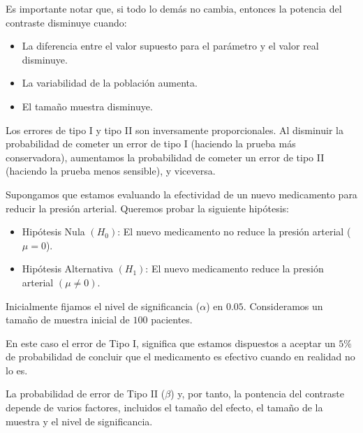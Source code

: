 \documentclass[
  letterpaper,
  DIV=11,
  numbers=noendperiod]{scrreprt}
\providecommand{\tightlist}{%
  \setlength{\itemsep}{0pt}\setlength{\parskip}{0pt}}\usepackage{longtable,booktabs,array}
\begin{document}
Es importante notar que, si todo lo demás no cambia, entonces la
potencia del contraste disminuye cuando:

\begin{itemize}
\tightlist
\item
  La diferencia entre el valor supuesto para el parámetro y el valor
  real disminuye.
\item
  La variabilidad de la población aumenta.
\item
  El tamaño muestra disminuye.
\end{itemize}

\begin{tcolorbox}[enhanced jigsaw, arc=.35mm, breakable, coltitle=black, left=2mm, opacityback=0, bottomtitle=1mm, colbacktitle=quarto-callout-tip-color!10!white, title=\textcolor{quarto-callout-tip-color}{\faLightbulb}\hspace{0.5em}{Ejemplo Práctico. Errores Tipo I y II}, titlerule=0mm, colback=white, colframe=quarto-callout-tip-color-frame, bottomrule=.15mm, rightrule=.15mm, opacitybacktitle=0.6, toptitle=1mm, toprule=.15mm, leftrule=.75mm]

Los errores de tipo I y tipo II son inversamente proporcionales. Al
disminuir la probabilidad de cometer un error de tipo I (haciendo la
prueba más conservadora), aumentamos la probabilidad de cometer un error
de tipo II (haciendo la prueba menos sensible), y viceversa.

Supongamos que estamos evaluando la efectividad de un nuevo medicamento
para reducir la presión arterial. Queremos probar la siguiente
hipótesis:

\begin{itemize}
\tightlist
\item
  Hipótesis Nula \((H_0)\): El nuevo medicamento no reduce la presión
  arterial (\(\mu = 0\)).
\item
  Hipótesis Alternativa \((H_1)\): El nuevo medicamento reduce la
  presión arterial \((\mu \neq 0)\).
\end{itemize}

Inicialmente fijamos el nivel de significancia (\(\alpha\)) en \(0.05\).
Consideramos un tamaño de muestra inicial de \(100\) pacientes.

En este caso el error de Tipo I, significa que estamos dispuestos a
aceptar un \(5\%\) de probabilidad de concluir que el medicamento es
efectivo cuando en realidad no lo es.

La probabilidad de error de Tipo II (\(\beta\)) y, por tanto, la
pontencia del contraste depende de varios factores, incluidos el tamaño
del efecto, el tamaño de la muestra y el nivel de significancia.


\end{tcolorbox}
\end{document}
